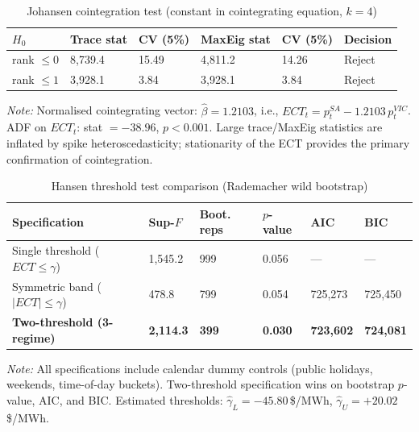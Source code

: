 \documentclass[12pt,a4paper]{article}
\newcommand{\ect}{\mathit{ECT}}
\begin{document}
\begin{table}[htbp]
  \centering
  \caption{Johansen cointegration test (constant in cointegrating equation, $k = 4$)}
  \label{tab:johansen}
  \begin{threeparttable}
    \begin{tabular}{lR{2.0cm}R{1.8cm}R{2.0cm}R{1.8cm}R{2.0cm}}
      \toprule
      $H_0$ & Trace stat & CV (5\%) & MaxEig stat & CV (5\%) & Decision \\
      \midrule
      rank $\le 0$ & 8{,}739.4 & 15.49 & 4{,}811.2 & 14.26 & Reject \\
      rank $\le 1$ & 3{,}928.1 & 3.84  & 3{,}928.1 & 3.84  & Reject \\
      \bottomrule
    \end{tabular}
    \begin{tablenotes}
      \small
      \item \textit{Note:} Normalised cointegrating vector:
        $\hat\beta = 1.2103$, i.e.,
        $\ect_t = p_t^{SA} - 1.2103\,p_t^{VIC}$.
        ADF on $\ect_t$: stat $= -38.96$, $p < 0.001$.  Large trace/MaxEig
        statistics are inflated by spike heteroscedasticity; stationarity of
        the ECT provides the primary confirmation of cointegration.
    \end{tablenotes}
  \end{threeparttable}
\end{table}

\begin{table}[htbp]
  \centering
  \caption{Hansen threshold test comparison (Rademacher wild bootstrap)}
  \label{tab:thresh}
  \begin{threeparttable}
    \begin{tabular}{lC{2cm}C{2cm}C{2cm}C{1.5cm}C{1.8cm}}
      \toprule
      Specification & Sup-$F$ & Boot. reps & $p$-value & AIC & BIC \\
      \midrule
      Single threshold ($\ect \le \gamma$) & 1{,}545.2 & 999 & 0.056 & — & — \\
      Symmetric band ($|\ect| \le \gamma$) & 478.8 & 799 & 0.054 & 725{,}273 & 725{,}450 \\
      \textbf{Two-threshold (3-regime)} & \textbf{2{,}114.3} & \textbf{399} & \textbf{0.030} & \textbf{723{,}602} & \textbf{724{,}081} \\
      \bottomrule
    \end{tabular}
    \begin{tablenotes}
      \small
      \item \textit{Note:} All specifications include calendar dummy controls
        (public holidays, weekends, time-of-day buckets).  Two-threshold
        specification wins on bootstrap $p$-value, AIC, and BIC.  Estimated
        thresholds: $\hat\gamma_L = -45.80$\,\$/MWh,
        $\hat\gamma_U = +20.02$\,\$/MWh.
    \end{tablenotes}
  \end{threeparttable}
\end{table}
\end{document}
